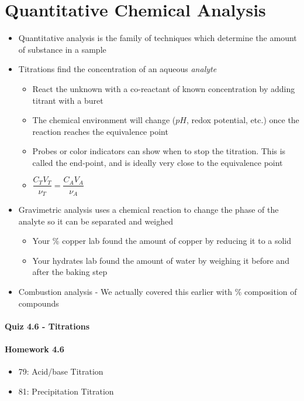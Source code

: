 \documentclass[12pt, openany, letterpaper]{memoir}
\begin{document}
\section{Quantitative Chemical Analysis}
\begin{itemize}
  \item Quantitative analysis is the family of techniques which determine the amount of substance in a sample
  \item Titrations find the concentration of an aqueous \emph{analyte}
    \begin{itemize}
      \item React the unknown with a co-reactant of known concentration by adding titrant with a buret
      \item The chemical environment will change ($pH$, redox potential, etc.) once the reaction reaches the equivalence point
      \item Probes or color indicators can show when to stop the titration. This is called the end-point, and is ideally very close to the equivalence point
      \item $\dfrac{C_TV_T}{\nu_T}=\dfrac{C_AV_A}{\nu_A}$
    \end{itemize}
  \item Gravimetric analysis uses a chemical reaction to change the phase of the analyte so it can be separated and weighed
    \begin{itemize}
      \item Your \% copper lab found the amount of copper by reducing it to a solid
      \item Your hydrates lab found the amount of water by weighing it before and after the baking step
    \end{itemize}
  \item Combustion analysis - We actually covered this earlier with \% composition of compounds
\end{itemize}

\paragraph*{Quiz 4.6 - Titrations}
\paragraph*{Homework 4.6}
\begin{itemize}
  \item 79: Acid/base Titration
  \item 81: Precipitation Titration
\end{itemize}
\end{document}
